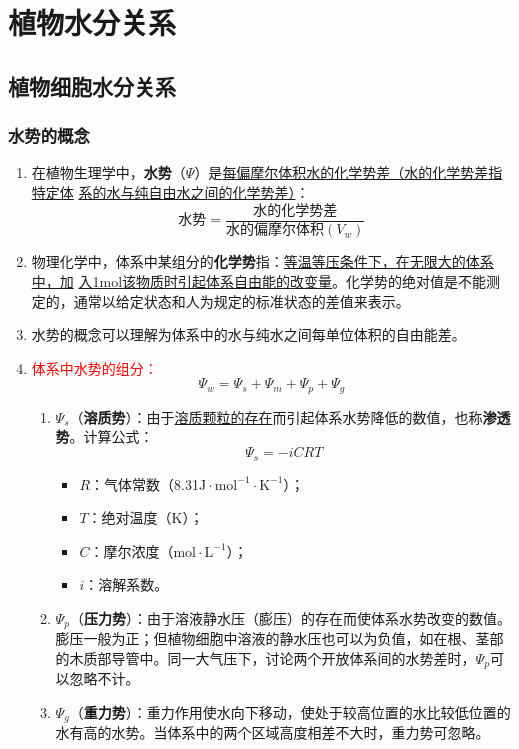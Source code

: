 \chapter{植物水分关系}
\section{植物细胞水分关系}
\subsection{水势的概念}
\begin{enumerate}
    \item 在植物生理学中，\textbf{水势}（$\Psi$）是\uline{每偏摩尔体积水的化学势差（水的化学势差指特定体} \uline{系的水与纯自由水之间的化学势差）}：
    \[
        \text{水势}=\frac{\text{水的化学势差}}{\text{水的偏摩尔体积}(V_w)}
    \]
    \item 物理化学中，体系中某组分的\textbf{化学势}指：\uline{等温等压条件下，在无限大的体系中，加} \uline{入1mol该物质时引起体系自由能的改变量}。化学势的绝对值是不能测定的，通常以给定状态和人为规定的标准状态的差值来表示。
    \item 水势的概念可以理解为体系中的水与纯水之间每单位体积的自由能差。
    \item \textcolor{red}{体系中水势的组分：}
    \[
        \Psi_w=\Psi_s+\Psi_m+\Psi_p+\Psi_g
    \]
    \begin{enumerate}
        \item $\Psi_s$（\textbf{溶质势}）：由于\uline{溶质颗粒的存在}而引起体系水势降低的数值，也称\textbf{渗透势}。计算公式：
        \[
            \Psi_s=-iCRT
        \]
        \begin{itemize}
            \item $R$：气体常数（8.31$\text{J}\cdot\text{mol}^{-1}\cdot\text{K}^{-1}$）；
            \item $T$：绝对温度（K）；
            \item $C$：摩尔浓度（$\text{mol}\cdot\text{L}^{-1}$）；
            \item $i$：溶解系数。
        \end{itemize}
        \item $\Psi_p$（\textbf{压力势}）：由于溶液静水压（膨压）的存在而使体系水势改变的数值。膨压一般为正；但植物细胞中溶液的静水压也可以为负值，如在根、茎部的木质部导管中。同一大气压下，讨论两个开放体系间的水势差时，$\Psi_p$可以忽略不计。
        \item $\Psi_g$（\textbf{重力势}）：重力作用使水向下移动，使处于较高位置的水比较低位置的水有高的水势。当体系中的两个区域高度相差不大时，重力势可忽略。

\end{enumerate}
\end{enumerate}
